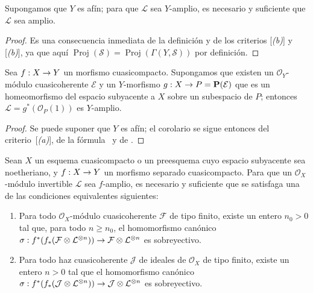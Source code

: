 \documentclass[oneside,10pt]{amsart}
\makeatletter
\renewcommand{\geq}{\geqslant}
\newcommand{\ega@arrow}[2]{\mathchoice{#1}{#2}{#2}{#2}}
\renewcommand{\to}{\ega@arrow{\longrightarrow}{\rightarrow}}
\let\EGAOriginalLabel\label
\renewcommand{\label}[1]{\phantomsection\EGAOriginalLabel{#1}}
\makeatother
\begin{document}
\begin{corollary}[4.6.6]
\label{II.4.6.6-fr}
Supongamos que $Y$ es afín;
para que $\mathcal{L}$ sea $Y$-amplio, es necesario y suficiente que $\mathcal{L}$ sea amplio.
\end{corollary}

\begin{proof}
Es una consecuencia inmediata de la definición  y de los criterios [\emph{(b)}] y [\emph{(b)}], ya que aquí $\operatorname{Proj}(\mathcal{S})
=\operatorname{Proj}(\Gamma(Y,\mathcal{S}))$ por definición.
\end{proof}

\begin{corollary}[4.6.7]
\label{II.4.6.7-fr}
Sea $f:X\to Y$ un morfismo cuasicompacto.
Supongamos que existen un $\mathcal{O}_Y$-módulo cuasicoherente $\mathcal{E}$ y un $Y$-morfismo $g:X\to P=\mathbf{P}(\mathcal{E})$ que es un homeomorfismo del espacio subyacente a $X$ sobre un subespacio de $P$;
entonces $\mathcal{L}=g^*(\mathcal{O}_P(1))$ es $Y$-amplio.
\end{corollary}

\begin{proof}
Se puede suponer que $Y$ es afín;
el corolario se sigue entonces del criterio~[\emph{(a)}], de la fórmula~ y de .
\end{proof}

\begin{proposition}[4.6.8]
\label{II.4.6.8-fr}
Sean $X$ un esquema cuasicompacto o un preesquema cuyo espacio subyacente sea noetheriano, y $f:X\to Y$ un morfismo separado cuasicompacto.
Para que un $\mathcal{O}_X$-módulo invertible $\mathcal{L}$ sea $f$-amplio, es necesario y suficiente que se satisfaga una de las condiciones equivalentes siguientes:
\begin{enumerate}
  \item[\rm{(c)}] Para todo $\mathcal{O}_X$-módulo cuasicoherente $\mathcal{F}$ de tipo finito, existe un entero $n_0>0$ tal que, para todo $n\geq n_0$, el homomorfismo canónico $\sigma:f^*(f_*(\mathcal{F}\otimes\mathcal{L}^{\otimes n}))\to
  \mathcal{F}\otimes\mathcal{L}^{\otimes n}$ es sobreyectivo.
  \item[\rm{(c')}] Para todo haz cuasicoherente $\mathcal{J}$ de ideales de $\mathcal{O}_X$ de tipo finito, existe un entero $n>0$ tal que el homomorfismo canónico $\sigma:f^*(f_*(\mathcal{J}\otimes\mathcal{L}^{\otimes n}))\to
  \mathcal{J}\otimes\mathcal{L}^{\otimes n}$ es sobreyectivo.
\end{enumerate}
\end{proposition}
\end{document}
